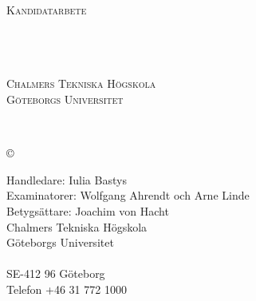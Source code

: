 \newpage
\thispagestyle{empty}
\begin{center}

    \textsc{\large Kandidatarbete \the\year{} }\\[4cm]

    \textbf{\Large \ambaTitleNewLine} \\[1cm]

    {\linespread{1.2}\large
    \StrSubstitute{\ambaAuthors}{,}{\\}
    \\ %
    }

    \vfill

    \ambaDepartmentSwedish{} \\
    \textsc{Chalmers Tekniska Högskola} \\
    \textsc{Göteborgs Universitet} \\
    \ambaCityCountryYearSwedish{}
\end{center}


\newpage
{\ambaTitle}\\
{\ambaAuthors}
\setlength{\parskip}{0.5cm}
\vspace{1cm}

\copyright{~{\ambaAuthors{} \the\year}}
\setlength{\parskip}{1cm}

Handledare: Iulia Bastys \\
Examinatorer: Wolfgang Ahrendt och Arne Linde \\
Betygsättare: Joachim von Hacht \\[1cm]

Chalmers Tekniska Högskola\\
Göteborgs Universitet\\
\ambaDepartmentSwedish{} \\
SE-412 96 Göteborg\\
Telefon +46 31 772 1000 \setlength{\parskip}{0.5cm}

\vfill
\ambaCityCountryYearSwedish{}
